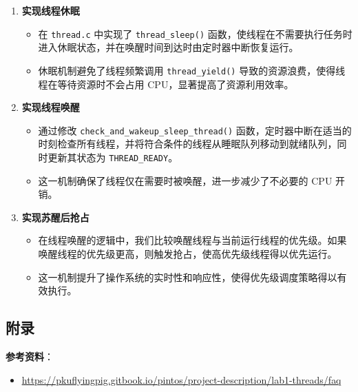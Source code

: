 \begin{enumerate}
    \item \textbf{实现线程休眠}  
    \begin{itemize}
        \item 在 \texttt{thread.c} 中实现了 \texttt{thread\_sleep()} 函数，使线程在不需要执行任务时进入休眠状态，并在唤醒时间到达时由定时器中断恢复运行。
        \item 休眠机制避免了线程频繁调用 \texttt{thread\_yield()} 导致的资源浪费，使得线程在等待资源时不会占用 CPU，显著提高了资源利用效率。
    \end{itemize}

    \item \textbf{实现线程唤醒}  
    \begin{itemize}
        \item 通过修改 \texttt{check\_and\_wakeup\_sleep\_thread()} 函数，定时器中断在适当的时刻检查所有线程，并将符合条件的线程从睡眠队列移动到就绪队列，同时更新其状态为 \texttt{THREAD\_READY}。
        \item 这一机制确保了线程仅在需要时被唤醒，进一步减少了不必要的 CPU 开销。
    \end{itemize}

    \item \textbf{实现苏醒后抢占}  
    \begin{itemize}
        \item 在线程唤醒的逻辑中，我们比较唤醒线程与当前运行线程的优先级。如果唤醒线程的优先级更高，则触发抢占，使高优先级线程得以优先运行。
        \item 这一机制提升了操作系统的实时性和响应性，使得优先级调度策略得以有效执行。
    \end{itemize}
\end{enumerate}

\subsection{附录}

\textbf{参考资料}：

\begin{itemize}
    \item \href{https://pkuflyingpig.gitbook.io/pintos/project-description/lab1-threads/faq}{\underline{https://pkuflyingpig.gitbook.io/pintos/project-description/lab1-threads/faq}}
\end{itemize}

